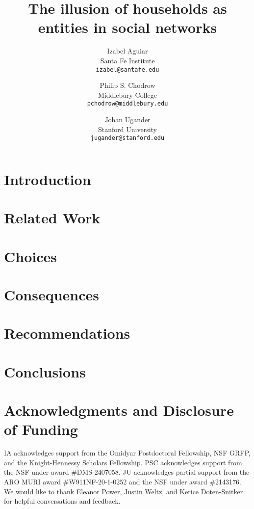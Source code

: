 \documentclass[oneside,11pt]{article}
\title{\vspace{-1.5cm}The illusion of households as entities in social networks}
\author{Izabel Aguiar\\ Santa Fe Institute \\ \texttt{izabel@santafe.edu} 
      \and
      Philip S. Chodrow\\Middlebury College\\  \texttt{pchodrow@middlebury.edu}
      \and
      Johan Ugander\\ Stanford University\\ \texttt{jugander@stanford.edu}}
\date{}
\begin{document}
 
\maketitle

\begin{abstract}

\end{abstract}


\section{Introduction} \label{sec:intro}


\section{Related Work}\label{sec:background}


\section{Choices} \label{sec:choices}


\section{Consequences} \label{sec:consequences}



\section{Recommendations} \label{sec:rec}


\section{Conclusions} \label{sec:conclusion}


\section*{Acknowledgments and Disclosure of Funding} 
IA acknowledges support from the Omidyar Postdoctoral Fellowship, NSF GRFP, and the Knight-Hennessy Scholars Fellowship. PSC acknowledges support from the NSF under award \#DMS-2407058. JU acknowledges partial support from the ARO MURI award \#W911NF-20-1-0252 and the NSF under award \#2143176. We would like to thank Eleanor Power, Justin Weltz, and Kerice Doten-Snitker for helpful conversations and feedback.


\clearpage



\appendix
 
\end{document}
